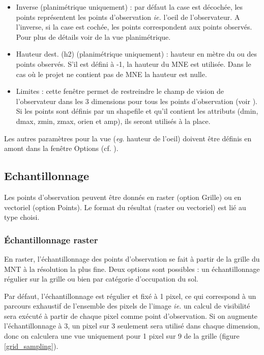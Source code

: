 \documentclass{report}
\begin{document}
\begin{itemize}
	\item Inverse (planimétrique uniquement) : par défaut la case est décochée, les points représentent les points d'observation \textit{ie.} l'oeil de l'observateur. A l'inverse, si la case est cochée, les points correspondent aux points observés. Pour plus de détails voir  de la vue planimétrique.
	\item Hauteur dest. (h2) (planimétrique uniquement) : hauteur en mètre du ou des points observés. S'il est défini à -1, la hauteur du MNE est utilisée. Dans le cas où le projet ne contient pas de MNE la hauteur est nulle.
	\item Limites : cette fenêtre permet de restreindre le champ de vision de l'observateur dans les 3 dimensions pour tous les points d'observation (voir ). Si les points sont définis par un shapefile et qu'il contient les attributs (dmin, dmax, zmin, zmax, orien et amp), ils seront utilisés à la place.
\end{itemize}
Les autres paramètres pour la vue (\textit{eg.} hauteur de l'oeil) doivent être définis en amont dans la fenêtre Options (cf. ).

\subsection{Echantillonnage}
\label{sampling}
Les points d'observation peuvent être donnés en raster (option Grille) ou en vectoriel (option Points). Le format du résultat (raster ou vectoriel) est lié au type choisi.

\subsubsection{Échantillonnage raster}
En raster, l'échantillonnage des points d'observation se fait à partir de la grille du MNT à la résolution la plus fine. Deux options sont possibles : un échantillonnage régulier sur la grille ou bien par catégorie d'occupation du sol.

Par défaut, l'échantillonnage est régulier et fixé à 1 pixel, ce qui correspond à un parcours exhaustif de l'ensemble des pixels de l'image \textit{ie.} un calcul de visibilité sera exécuté à partir de chaque pixel comme point d'observation. Si on augmente l'échantillonnage à 3, un pixel sur 3 seulement sera utilisé dans chaque dimension, donc on calculera une vue uniquement pour 1 pixel sur 9 de la grille (figure \ref{grid_sampling}).
\end{document}

